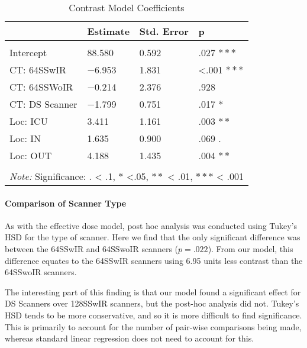 \documentclass[]{article}
\let\oldparagraph\paragraph
\renewcommand{\paragraph}[1]{\oldparagraph{#1}\mbox{}}
\begin{document}
\begin{table}[H] \centering 
  \caption{Contrast Model Coefficients} 
\begin{tabular}{p{3cm}|p{3cm}p{3cm}p{3cm}}
\\[-1.8ex] \hline 
\hline
    & Estimate & Std. Error & p  \\
\hline \\[-1.8ex] 
 Intercept   & 88.580 & 0.592 & .027 $***$ \\
 CT: 64SSwIR & $-$6.953 & 1.831 & <.001 $***$  \\
 CT: 64SSWoIR & $-$0.214 & 2.376 & .928 \\
 CT: DS Scanner &$-$1.799 & 0.751 & .017 $*$ \\
 Loc: ICU & 3.411 & 1.161 & .003 $**$\\
 Loc: IN & 1.635 & 0.900 & .069 $.$ \\
 Loc: OUT & 4.188 & 1.435 & .004 $**$ \\
\hline 
\hline \\[-1.8ex]
\multicolumn{4}{l}{\textit{Note:} Significance: $.$ < .1, $*$ <.05, $**$ < .01, $***$ < .001}
 \end{tabular}
\end{table}

\paragraph{Comparison of Scanner
Type}\label{comparison-of-scanner-type-1}

As with the effective dose model, post hoc analysis was conducted using
Tukey's HSD for the type of scanner. Here we find that the only
significant difference was between the 64SSwIR and 64SSwoIR scanners
(\(p = .022\)). From our model, this difference equates to the 64SSwIR
scanners using 6.95 units less contrast than the 64SSwoIR scanners.

The interesting part of this finding is that our model found a
significant effect for DS Scanners over 128SSwIR scanners, but the
post-hoc analysis did not. Tukey's HSD tends to be more conservative,
and so it is more difficult to find significance. This is primarily to
account for the number of pair-wise comparisons being made, whereas
standard linear regression does not need to account for this.
\end{document}
